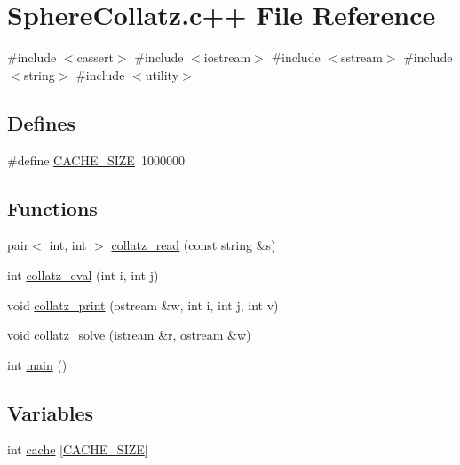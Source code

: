\hypertarget{_sphere_collatz_8c_09_09}{\section{\-Sphere\-Collatz.\-c++ \-File \-Reference}
\label{_sphere_collatz_8c_09_09}
}
{\ttfamily \#include $<$cassert$>$}\*
{\ttfamily \#include $<$iostream$>$}\*
{\ttfamily \#include $<$sstream$>$}\*
{\ttfamily \#include $<$string$>$}\*
{\ttfamily \#include $<$utility$>$}\*
\subsection*{\-Defines}
\begin{DoxyCompactItemize}
\item 
\#define \hyperlink{_sphere_collatz_8c_09_09_a8a6befd630ea1c2ab260266f7466540c}{\-C\-A\-C\-H\-E\-\_\-\-S\-I\-Z\-E}~1000000
\end{DoxyCompactItemize}
\subsection*{\-Functions}
\begin{DoxyCompactItemize}
\item 
pair$<$ int, int $>$ \hyperlink{_sphere_collatz_8c_09_09_a2772f8a734aeab48332eb3b282f991ba}{collatz\-\_\-read} (const string \&s)
\item 
int \hyperlink{_sphere_collatz_8c_09_09_a0b0d3827a619c18aa4d96b8ee8b1c47d}{collatz\-\_\-eval} (int i, int j)
\item 
void \hyperlink{_sphere_collatz_8c_09_09_aeda0b7ea3e40e1e7487ccc436f33a559}{collatz\-\_\-print} (ostream \&w, int i, int j, int v)
\item 
void \hyperlink{_sphere_collatz_8c_09_09_a0ac646d2122741f9a9a52201bf9551cc}{collatz\-\_\-solve} (istream \&r, ostream \&w)
\item 
int \hyperlink{_sphere_collatz_8c_09_09_ae66f6b31b5ad750f1fe042a706a4e3d4}{main} ()
\end{DoxyCompactItemize}
\subsection*{\-Variables}
\begin{DoxyCompactItemize}
\item 
int \hyperlink{_sphere_collatz_8c_09_09_ae32fc8849490fce1c4d8cf9c31bb2e07}{cache} \mbox{[}\hyperlink{_sphere_collatz_8c_09_09_a8a6befd630ea1c2ab260266f7466540c}{\-C\-A\-C\-H\-E\-\_\-\-S\-I\-Z\-E}\mbox{]}
\end{DoxyCompactItemize}


